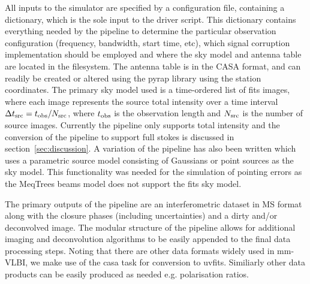 All inputs to the simulator are specified by a configuration file, containing a dictionary, which is the sole input to the driver script. This dictionary contains everything needed by the pipeline to determine the particular observation configuration (frequency, bandwidth, start time, etc), which signal corruption implementation should be employed and where the sky model and antenna table are located in the filesystem. The antenna table is in the CASA format, and can readily be created or altered using the {\sc pyrap} library using the station coordinates. The primary sky model used is a time-ordered list of {\sc fits} images, where each image represents the source total intensity over a time interval $\Delta t_{\rm src} = t_{\rm obs}/N_{\rm src}$, where $t_{\rm obs}$ is the observation length and $N_{\rm src}$ is the number of source images. Currently the pipeline only supports total intensity and the conversion of the pipeline to support full stokes is discussed in section~\ref{sec:discussion}. A variation of the pipeline has also been written which uses a parametric source model consisting of Gaussians or point sources as the sky model. This functionality was needed for the simulation of pointing errors as the {\sc MeqTrees} beams model does not support the {\sc fits} sky model.


The primary outputs of the pipeline are an interferometric dataset in MS format along with the closure phases (including uncertainties) and a dirty and/or deconvolved image. The modular structure of the pipeline allows for additional imaging and deconvolution algorithms to be easily appended to the final data processing steps. Noting that there are other data formats widely used in mm-VLBI, we make use of the {\sc casa} task for conversion to {\sc uvfits}. Similiarly other data products can be easily produced as needed e.g. polarisation ratios.




